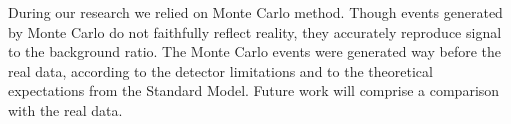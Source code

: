During our research we relied on Monte Carlo method. 
Though events generated by Monte Carlo do not faithfully reflect reality,
they accurately reproduce signal to the background ratio.
The Monte Carlo events were generated way before the real data, according to the detector 
limitations and to the theoretical expectations from the Standard Model. 
Future work will comprise a comparison with the real data.
